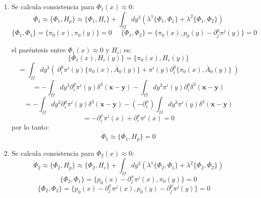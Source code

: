 \documentclass[a4paper,12pt]{article}
\begin{document}
\begin{enumerate}
 \item[\fbox{1.}] Se calcula consistencia para $\Phi_1(x)\approx0$:
\begin{equation}
 \dot{\Phi}_1\approx\{\Phi_1,H_p\}\approx\{\Phi_1,H_c\}+ \int_{\Omega}dy^3(\lambda^1\{\Phi_1,\Phi_1\}+\lambda^2\{\Phi_1,\Phi_2\})   
\end{equation}
$$\{\Phi_1,\Phi_1\}=\{\pi_0 (x) , \pi_0(y)\}=0\ \ \ \ \ \ \{\Phi_1,\Phi_2\}=\{\pi_0(x)  ,  p_0(y)-\partial_j^y\pi^j(y)\}=0$$
\vspace{0,05cm}

el paréntesis entre  $\Phi_1(x)\approx0$ y $H_c$; es:
$$\{\Phi_1(x),H_c(y)\}=\{\pi_0(x),H_c(y)\}$$
$$=\int_{\Omega}dy^3(\ \partial_i^y \pi^i(y)\{\pi_0(x),\bar{A}_0(y)\}+\pi^i(y)\partial_i^y\{\pi_0(x),\bar{A}_0(y)\}\ )$$
$$=-\int_{\Omega}dy^3 \partial_i^y \pi^i(y)\delta^3(\textbf{x}-\textbf{y})-\int_{\Omega}dy^3 \pi^i(y)\partial_i^y \delta^3(\textbf{x}-\textbf{y}) $$
$$=-\int_{\Omega}dy^3 \partial_i^y\pi^i(y)\delta^3(\textbf{x}-\textbf{y})-(-\partial_i^x)\int_{\Omega}dy^3 \pi^i(y)\delta^3(\textbf{x}-\textbf{y}) $$
$$=-\partial_i^x \pi^i(x)+\partial_i^x \pi^i(x)=0$$
por lo tanto:
$$\dot{\Phi}_1\approx\{\Phi_1,H_p\}=0$$
\item[\fbox{2.}] Se calcula consistencia para $\Phi_2(x)\approx0$:
\begin{equation}
 \dot{\Phi}_2\approx\{\Phi_2,H_p\}\approx\{\Phi_2,H_c\}+ \int_{\Omega}dy^3(\lambda^1\{\Phi_2,\Phi_1\}+\lambda^2\{\Phi_2,\Phi_2\})   
\end{equation}
$$\{\Phi_2,\Phi_1\}=\{p_0(x)-\partial_j^x\pi^j(x),\pi_0(y)\}=0$$
$$ \{\Phi_2,\Phi_2\}=\{p_0(x)-\partial_j^x\pi^j(x),p_0(y)-\partial_j^y\pi^j(y)\}=0\ \ \ \ \ \ $$
\vspace{0,05cm}


\end{enumerate}
\end{document}
